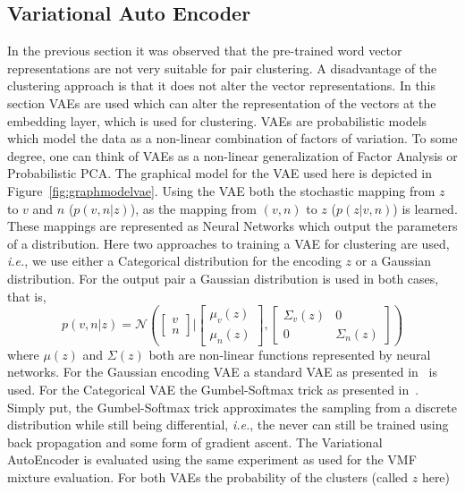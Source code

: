 \documentclass[11pt]{scrartcl}
\newcommand{\ie}{\textit{i.e.}}
\begin{document}
\subsection{Variational Auto Encoder}
\label{sec:vae}
In the previous section it was observed that the pre-trained word
vector representations are not very suitable for pair clustering. A
disadvantage of the clustering approach is that it does not alter the
vector representations.  In this section VAEs are used which can alter
the representation of the vectors at the embedding layer, which is
used for clustering.  VAEs are probabilistic models which model the
data as a non-linear combination of factors of variation. To some
degree, one can think of VAEs as a non-linear generalization of Factor
Analysis or Probabilistic PCA. The graphical model for the VAE used
here is depicted in Figure~\ref{fig:graphmodelvae}. Using the VAE both
the stochastic mapping from $z$ to $v$ and $n$ ($p(v, n| z)$), as the
mapping from $(v, n)$ to $z$ ($p(z|v, n)$) is learned. These mappings
are represented as Neural Networks which output the parameters of a
distribution. Here two approaches to training a VAE for clustering are
used, \ie, we use either a Categorical distribution for the encoding
$z$ or a Gaussian distribution. For the output pair a Gaussian
distribution is used in both cases, that is,
\[
  p(v, n| z) = \mathcal{N}\left(
  \begin{bmatrix} v \\ n \end{bmatrix} {\Big|}
  \begin{bmatrix} \mu_v(z) \\ \mu_n(z) \end{bmatrix},
  \begin{bmatrix} \Sigma_v(z) & 0 \\
    0 & \Sigma_n(z) \end{bmatrix}
  \right)
\]
where $\mu(z)$ and $\Sigma(z)$ both are non-linear functions
represented by neural networks. For the Gaussian encoding VAE a
standard VAE as presented in~\cite{kingma2013auto,
rezende2014stochastic} is used. For the Categorical VAE the
Gumbel-Softmax trick as presented in~\cite{jang2016categorical,
maddison2016concrete}. Simply put, the Gumbel-Softmax trick
approximates the sampling from a discrete distribution while still
being differential, \ie, the never can still be trained using back
propagation and some form of gradient ascent. The Variational
AutoEncoder is evaluated using the same experiment as used for the VMF
mixture evaluation. For both VAEs the probability of the clusters (called $z$ here)
\end{document}
